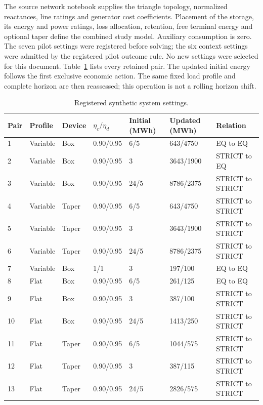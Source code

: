 The source network notebook supplies the triangle topology, normalized
reactances, line ratings and generator cost coefficients. Placement of the
storage, its energy and power ratings, loss allocation, retention, free
terminal energy and optional taper define the combined study model.
Auxiliary consumption is zero. The seven pilot settings were registered
before solving; the six context settings were admitted by the registered
pilot outcome rule. No new settings were selected for this document.
Table~\ref{tab:registered_system_settings} lists every retained pair.
The updated initial energy follows the first exclusive economic action.
The same fixed load profile and complete horizon are then reassessed;
this operation is not a rolling horizon shift.
\begin{table}[htbp]
\caption{Registered synthetic system settings.}\label{tab:registered_system_settings}
\begin{tabular}{lllllll}
\toprule
Pair & Profile & Device & $\eta_c/\eta_d$ & Initial (MWh) & Updated (MWh) & Relation\\\midrule
1 & Variable & Box & 0.90/0.95 & 6/5 & 643/4750 & EQ to EQ\\
2 & Variable & Box & 0.90/0.95 & 3 & 3643/1900 & STRICT to EQ\\
3 & Variable & Box & 0.90/0.95 & 24/5 & 8786/2375 & STRICT to STRICT\\
4 & Variable & Taper & 0.90/0.95 & 6/5 & 643/4750 & STRICT to STRICT\\
5 & Variable & Taper & 0.90/0.95 & 3 & 3643/1900 & STRICT to STRICT\\
6 & Variable & Taper & 0.90/0.95 & 24/5 & 8786/2375 & STRICT to STRICT\\
7 & Variable & Box & 1/1 & 3 & 197/100 & EQ to EQ\\
8 & Flat & Box & 0.90/0.95 & 6/5 & 261/125 & EQ to EQ\\
9 & Flat & Box & 0.90/0.95 & 3 & 387/100 & STRICT to STRICT\\
10 & Flat & Box & 0.90/0.95 & 24/5 & 1413/250 & STRICT to STRICT\\
11 & Flat & Taper & 0.90/0.95 & 6/5 & 1044/575 & STRICT to STRICT\\
12 & Flat & Taper & 0.90/0.95 & 3 & 387/115 & STRICT to STRICT\\
13 & Flat & Taper & 0.90/0.95 & 24/5 & 2826/575 & STRICT to STRICT\\
\bottomrule\end{tabular}\end{table}

